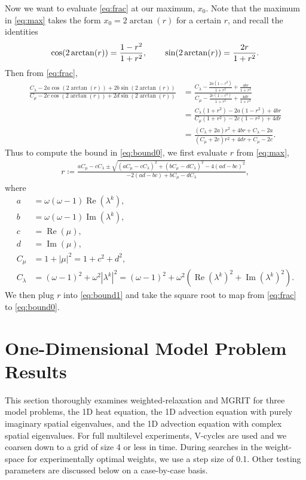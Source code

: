 \documentclass[VANCOUVER,STIX1COL]{WileyNJD-v2}
\newcommand{\Rea}{\operatorname{Re}}
\newcommand{\Ima}{\operatorname{Im}}
\begin{document}
Now we want to evaluate \eqref{eq:frac} at our maximum, $x_0$. Note
that the maximum in \eqref{eq:max} takes the form $x_0 = 2\arctan(r)$ for
a certain $r$, and recall the identities
%
\begin{align*}
\cos(2\arctan(r)) = \frac{1-r^2}{1+r^2}, \hspace{5ex}
\sin(2\arctan(r)) = \frac{2r}{1+r^2}.
\end{align*}
%
Then from \eqref{eq:frac},
%
\begin{align}\nonumber
\frac{C_\lambda - 2a\cos(2\arctan(r)) + 2b\sin(2\arctan(r))}
	{C_\mu - 2c\cos(2\arctan(r)) + 2d\sin(2\arctan(r))}
& = \frac{C_\lambda - \frac{2a(1-r^2)}{1+r^2} + \frac{4br}{1+r^2}}
	{C_\mu - \frac{2c(1-r^2)}{1+r^2} + \frac{4dr}{1+r^2}} \nonumber\\
& = \frac{C_\lambda(1+r^2) - 2a(1-r^2) + 4br}
	{C_\mu(1+r^2) - 2c(1-r^2) + 4dr} \nonumber\\
& = \frac{(C_\lambda + 2a)r^2 + 4br + C_\lambda - 2a}
	{(C_\mu + 2c)r^2 + 4dr + C_\mu - 2c}.\label{eq:bound1}
\end{align}
%
Thus to compute the bound in \eqref{eq:bound0}, we first evaluate 
$r$ from \eqref{eq:max},
%
\begin{align}\label{eq:r}
r \coloneqq \frac{a C_\mu - c C_\lambda \pm \sqrt{(aC_\mu - cC_\lambda)^2 + 
	(bC_\mu - dC_\lambda)^2 - 4(ad-bc)^2}}{-2(a d - b c) + b C_\mu - dC_\lambda},
\end{align}
%
where 
%
\begin{align*}
a & = \omega(\omega-1)\Rea(\lambda^k), \\
b & = \omega(\omega-1)\Ima(\lambda^k), \\
c & = \Rea(\mu), \\
d & = \Ima(\mu), \\
C_\mu & = 1 + |\mu|^2 = 1 + c^2+d^2, \\
C_\lambda & = (\omega-1)^2 + \omega^2|\lambda^k|^2 = (\omega-1)^2 +
	\omega^2(\Rea(\lambda^k)^2 + \Ima(\lambda^k)^2).
\end{align*}
%
We then plug $r$ into \eqref{eq:bound1} and take the square root to
map from \eqref{eq:frac} to \eqref{eq:bound0}.


\section{One-Dimensional Model Problem Results} \label{app2}
This section thoroughly examines weighted-relaxation and MGRIT for three model problems, the 1D heat equation, the 1D advection equation with purely imaginary spatial eigenvalues, and the 1D advection equation with complex spatial eigenvalues.
For full multilevel experiments, V-cycles are used and we coarsen down to a grid of size 4 or less in time.  During searches in the weight-space for experimentally optimal weights, we use a step size of 0.1.  Other testing parameters are discussed below on a case-by-case basis.
\end{document}
